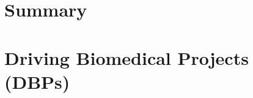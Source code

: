 \documentclass[arial,11pt]{article}
\begin{document}
\section{Summary}


\section{Driving Biomedical Projects (DBPs)}


%


\end{document}
